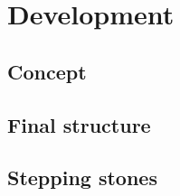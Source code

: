 
\chapter{Development}\label{chapter:development}

\section{Concept}
\section{Final structure}
\section{Stepping stones}